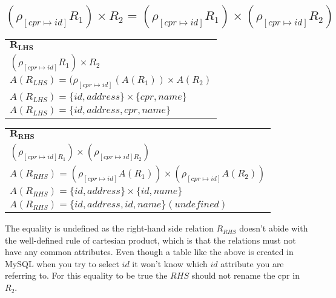 \subsection{$(\rho_{[cpr \mapsto id]}R_1) \times R_2 = (\rho_{[cpr \mapsto id]}R_1) \times (\rho_{[cpr \mapsto id]}R_2)$}

\begin{table}[ht]
	\begin{tabular}{l}
		$\bm{R_{LHS}}$  \\
		$(\rho_{[cpr \mapsto id]}R_1) \times R_2$  \\
		$A(R_{LHS}) = (\rho_{[cpr\mapsto id]}(A(R_1)) \times A(R_2)$  \\
		$A(R_{LHS}) = \{id, address\} \times \{cpr, name\}$  \\
		$A(R_{LHS}) = \{id, address, cpr, name\}$
	\end{tabular}
\end{table}

\begin{table}[ht]
	\begin{tabular}{l}
		$\bm{R_{RHS}}$ \\
	 	$(\rho_{[cpr \mapsto id]R_1}) \times (\rho_{[cpr \mapsto id]R_2})$ \\
		$A(R_{RHS}) = (\rho_{[cpr\mapsto id]}A(R_1)) \times (\rho_{[cpr \mapsto id]}A(R_2))$ \\
		$A(R_{RHS}) = \{id, address\} \times \{id, name\}$ \\
		$A(R_{RHS}) = \{id, address, id, name\}(undefined)$ 
	\end{tabular}
\end{table}
\FloatBarrier

The equality is undefined as the right-hand side relation $R_{RHS}$ doesn't abide with the well-defined rule of cartesian product, which is that the relations must not have any common attributes. Even though a table like the above is created in MySQL when you try to select $id$ it won't know which $id$ attribute you are referring to.
For this equality to be true the $RHS$ should not rename the cpr in $R_2$.\\\\
